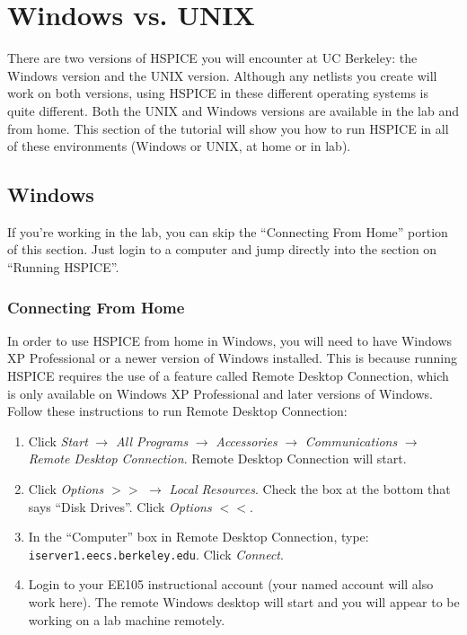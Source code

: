 \documentclass{article}
\begin{document}
\section{Windows vs. UNIX}

There are two versions of HSPICE you will encounter at UC Berkeley: the Windows version and the UNIX version. Although any netlists you create will work on both versions, using HSPICE in these different operating systems is quite different. Both the UNIX and Windows versions are available in the lab and from home. This section of the tutorial will show you how to run HSPICE in all of these environments (Windows or UNIX, at home or in lab).

\subsection{Windows}

If you're working in the lab, you can skip the ``Connecting From Home'' portion of this section. Just login to a computer and jump directly into the section on ``Running HSPICE''.

\subsubsection{Connecting From Home}

In order to use HSPICE from home in Windows, you will need to have Windows XP Professional or a newer version of Windows installed. This is because running HSPICE requires the use of a feature called Remote Desktop Connection, which is only available on Windows XP Professional and later versions of Windows. Follow these instructions to run Remote Desktop Connection:

\begin{enumerate}
\item Click \textit{Start} $\rightarrow$ \textit{All Programs} $\rightarrow$ \textit{Accessories} $\rightarrow$ \textit{Communications} $\rightarrow$ \textit{Remote Desktop Connection}. Remote Desktop Connection will start.
\item Click \textit{Options $>>$} $\rightarrow$ \textit{Local Resources}. Check the box at the bottom that says ``Disk Drives''. Click \textit{Options $<<$}.
\item In the ``Computer'' box in Remote Desktop Connection, type: \verb|iserver1.eecs.berkeley.edu|. Click \textit{Connect}.
\item Login to your EE105 instructional account (your named account will also work here). The remote Windows desktop will start and you will appear to be working on a lab machine remotely.
\end{enumerate}
\end{document}

